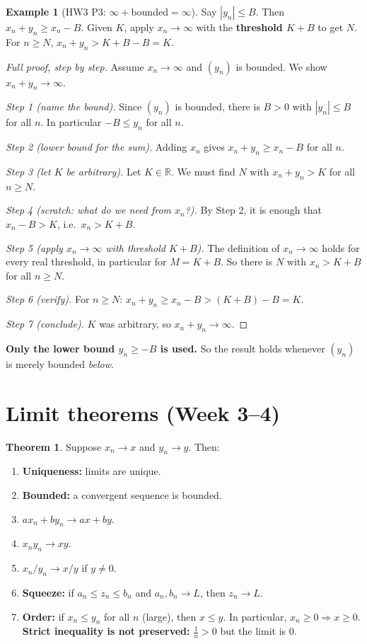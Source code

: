 \documentclass[11pt]{article}
\theoremstyle{definition}
\newtheorem{thm}[defn]{Theorem}
\newtheorem{ex}[defn]{Example}
\newcommand{\R}{\mathbb{R}}
\newcommand{\key}[1]{\textcolor{red!70!black}{\textbf{#1}}}
\begin{document}
\begin{ex}[HW3 P3: $\infty+$bounded$=\infty$]
Say $|y_n|\le B$. Then $x_n+y_n\ge x_n-B$. Given $K$, apply
$x_n\to\infty$ with the \key{threshold $K+B$} to get $N$. For $n\ge N$,
$x_n+y_n>K+B-B=K$.

\begin{proof}[Full proof, step by step]
Assume $x_n\to\infty$ and $(y_n)$ is bounded. We show $x_n+y_n\to\infty$.

\emph{Step 1 (name the bound).} Since $(y_n)$ is bounded, there is $B>0$
with $|y_n|\le B$ for all $n$. In particular $-B\le y_n$ for all $n$.

\emph{Step 2 (lower bound for the sum).} Adding $x_n$ gives
$x_n+y_n\ge x_n-B$ for all $n$.

\emph{Step 3 (let $K$ be arbitrary).} Let $K\in\R$. We must find $N$ with
$x_n+y_n>K$ for all $n\ge N$.

\emph{Step 4 (scratch: what do we need from $x_n$?).} By Step 2, it is
enough that $x_n-B>K$, i.e.\ $x_n>K+B$.

\emph{Step 5 (apply $x_n\to\infty$ with threshold $K+B$).} The definition
of $x_n\to\infty$ holds for every real threshold, in particular for
$M=K+B$. So there is $N$ with $x_n>K+B$ for all $n\ge N$.

\emph{Step 6 (verify).} For $n\ge N$:
$x_n+y_n\ge x_n-B>(K+B)-B=K$.

\emph{Step 7 (conclude).} $K$ was arbitrary, so $x_n+y_n\to\infty$.
\end{proof}
\noindent\key{Only the lower bound $y_n\ge-B$ is used.} So the result holds
whenever $(y_n)$ is merely bounded \emph{below}.
\end{ex}

\section{Limit theorems (Week 3--4)}

\begin{thm}
Suppose $x_n\to x$ and $y_n\to y$. Then:
\begin{enumerate}[nosep]
  \item \textbf{Uniqueness:} limits are unique.
  \item \textbf{Bounded:} a convergent sequence is bounded.
  \item $ax_n+by_n\to ax+by$.
  \item $x_ny_n\to xy$.
  \item $x_n/y_n\to x/y$ if $y\ne0$.
  \item \textbf{Squeeze:} if $a_n\le z_n\le b_n$ and $a_n,b_n\to L$, then
        $z_n\to L$.
  \item \textbf{Order:} if $x_n\le y_n$ for all $n$ (large), then
        $x\le y$. In particular, $x_n\ge0\Rightarrow x\ge0$.
        \key{Strict inequality is not preserved:} $\frac1n>0$ but the limit
        is $0$.
\end{enumerate}
\end{thm}
\end{document}
